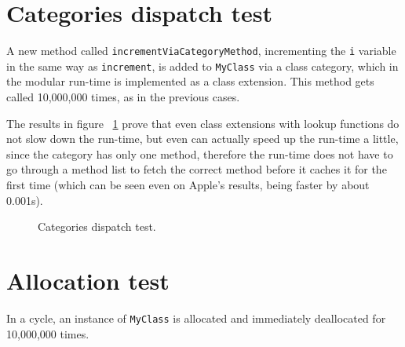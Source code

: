 \section{Categories dispatch test}

A new method called \verb=incrementViaCategoryMethod=, incrementing the \verb=i= variable in the same way as \verb=increment=, is added to \verb=MyClass= via a class category, which in the modular run-time is implemented as a class extension. This method gets called 10,000,000 times, as in the previous cases.

The results in figure ~\ref{fig:categories_dispatch_test} prove that even class extensions with lookup functions do not slow down the run-time, but even can actually speed up the run-time a little, since the category has only one method, therefore the run-time does not have to go through a method list to fetch the correct method before it caches it for the first time (which can be seen even on Apple's results, being faster by about 0.001s).

\begin{figure}[H]
  \centering{}
  \caption{Categories dispatch test.}
  \label{fig:categories_dispatch_test}
\end{figure}


\section{Allocation test}

In a cycle, an instance of \verb=MyClass= is allocated and immediately deallocated for 10,000,000 times.

